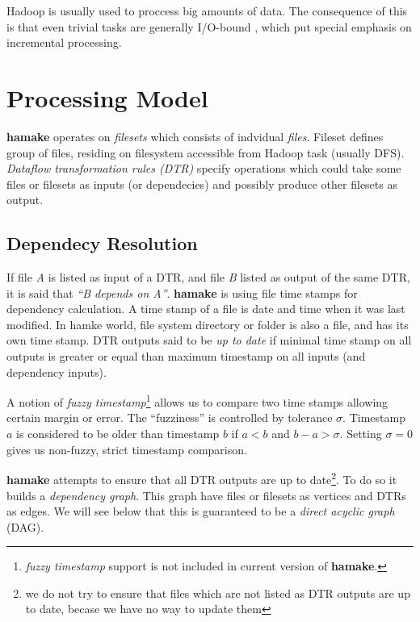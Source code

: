 \documentclass{article}
\begin{document}
Hadoop is usually used to proccess big amounts of data. The
consequence of this is that even trivial tasks are generally I/O-bound
\cite{hadoopattwitter},\cite{hs2010hadoopbench} which put special
emphasis on incremental processing.

\section{Processing Model}

\textbf{hamake} operates on \textit{filesets} which consists of indvidual
\textit{files}. Fileset defines group of files, residing on filesystem
accessible from Hadoop task (usually DFS). \textit{Dataflow
  transformation rules (DTR)} specify operations which could take some
files or filesets as inputs (or dependecies) and possibly produce
other filesets as output.

\subsection{Dependecy Resolution}

If file \textit{A} is listed as input of a DTR, and file \textit{B}
listed as output of the same DTR, it is said that \textit{``B depends
  on A''}. \textbf{hamake} is using file time stamps for dependency
calculation. A time stamp of a file is date and time when it was last
modified.  In hamke world, file system directory or folder is also a
file, and has its own time stamp. DTR outputs said to be \textit{up to
  date} if minimal time stamp on all outputs is greater or equal than
maximum timestamp on all inputs (and dependency inputs).

A notion of \textit{fuzzy timestamp}\footnote{\textit{fuzzy timestamp}
  support is not included in current version of \textbf{hamake}.}
allows us to compare two time stamps allowing certain margin or
error. The ``fuzziness'' is controlled by tolerance
$\sigma$. Timestamp $a$ is considered to be older than timestamp $b$
if $a<b$ and $b-a>\sigma$. Setting $\sigma=0$ gives us non-fuzzy,
strict timestamp comparison.

\textbf{hamake} attempts to ensure that all DTR outputs are up to
date\footnote{we do not try to ensure that files which are not listed
  as DTR outputs are up to date, becase we have no way to update
  them}. To do so it builds a \textit{dependency graph}. This graph
have files or filesets as vertices and DTRs as edges. We will see
below that this is guaranteed to be a \textit{direct acyclic graph}
(DAG).
\end{document}
